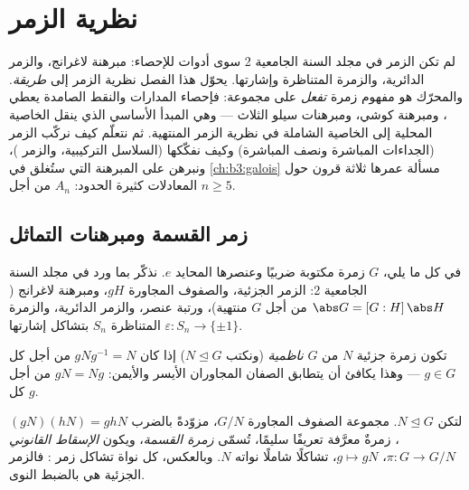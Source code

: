 \chapter{نظرية الزمر}\label{ch:b3:groups}

لم تكن الزمر في مجلد السنة الجامعية 2 سوى أدوات للإحصاء: مبرهنة
لاغرانج، والزمر الدائرية، والزمرة المتناظرة وإشارتها. يحوّل هذا
الفصل نظرية الزمر إلى \emph{طريقة}. والمحرّك هو مفهوم زمرة
\emph{تفعل} على مجموعة: فإحصاء المدارات والنقط الصامدة يعطي ، ومبرهنة كوشي، ومبرهنات سيلو الثلاث --- وهي المبدأ الأساسي
الذي ينقل الخاصية المحلية إلى الخاصية الشاملة في نظرية الزمر
المنتهية. ثم نتعلّم كيف نركّب الزمر (الجداءات المباشرة ونصف
المباشرة) وكيف نفكّكها (السلاسل التركيبية، والزمر )،
ونبرهن على المبرهنة التي ستُغلق في \cref{ch:b3:galois} مسألة عمرها ثلاثة
قرون حول المعادلات كثيرة الحدود:  $A_n$  من
أجل $n
\geq 5$.

\section{زمر القسمة ومبرهنات التماثل}

في كل ما يلي، $G$ زمرة مكتوبة ضربيًا وعنصرها المحايد $e$. نذكّر بما ورد في مجلد السنة الجامعية 2: الزمر الجزئية،
والصفوف المجاورة $gH$، ومبرهنة لاغرانج ($\abs G = [G:H]\,\abs H$ من أجل $G$
منتهية)، ورتبة عنصر، والزمر الدائرية، والزمرة المتناظرة $S_n$
بتشاكل إشارتها $\varepsilon \colon S_n \to \{\pm1\}$.

\begin{definition}\label{def:b3:groups:normal}
تكون زمرة جزئية $N$ من $G$ \emph{ناظمية}
(ونكتب $N \trianglelefteq G$) إذا كان $gNg^{-1} = N$ من أجل كل $g
\in G$ --- وهذا يكافئ أن يتطابق الصفان المجاوران الأيسر والأيمن: $gN =
Ng$ من أجل كل $g$.
\end{definition}

\begin{theorem}\label{thm:b3:groups:quotient}
لتكن $N \trianglelefteq G$. مجموعة الصفوف المجاورة $G/N$، مزوّدةً بالضرب
$(gN)(hN) = ghN$، زمرةٌ معرَّفة تعريفًا سليمًا، تُسمّى \emph{زمرة
القسمة}، ويكون \emph{الإسقاط القانوني} $\pi \colon G \to G/N$،
$g \mapsto gN$، تشاكلًا شاملًا نواته $N$. وبالعكس، كل نواة تشاكل
زمر : فالزمر الجزئية  هي بالضبط النوى.
\end{theorem}

